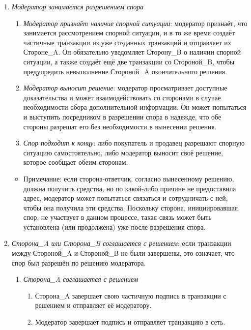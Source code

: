 \begin{enumerate}
\begin{enumerate}
        \item {\em Модератор занимается разрешением спора}
        \begin{enumerate}
            \item {\em Модератор признаёт наличие спорной ситуации}: модератор признаёт, что занимается рассмотрением спорной ситуации, и в то же время создаёт частич\-ные транзакции из уже созданных транзакций и отправляет их Стороне\_A. Он обязательно уведомляет Сторону\_B о наличии спорной ситуации, а также создаёт ещё две транзакции со Стороной\_B, чтобы предупредить невыполнение Стороной\_A окончательного решения.
            \item {\em Модератор выносит решение}: модератор просматривает доступные доказатель\-ства и может взаимодействовать со сторонами в случае необходимости сбора дополнительной информации. Он может попытаться и выступить посредником в разрешении спора в надежде, что обе стороны разрешат его без необходимости в вынесении решения.
            \item {\em Спор подходит к концу}: либо покупатель и продавец разрешают спорную ситуацию самостоятельно, либо модератор выносит своё решение, которое сооб\-щает обеим сторонам.
        \end{enumerate}{}
        \begin{itemize}
            \item Примечание: если сторона-ответчик, согласно вынесенному решению, должна получить средства, но по какой-либо причине не предоставила адрес, модератор может попытаться связаться и сотрудничать с ней, чтобы она получила эти средства. Поскольку сторона, инициировавшая спор, не участвует в данном процессе, такая связь может быть установлена (или продолжена) уже после разрешения спора.
        \end{itemize}{}
        \item {\em Сторона\_A или Сторона\_B соглашается с решением}: если транзакции между Стороной\_A и Стороной\_B не были завершены, это означает, что спор был разре\-шён по решению модератора.
        \begin{enumerate}
            \item {\em Сторона\_A соглашается с решением}
            \begin{enumerate}
                \item Сторона\_A завершает свою частичную подпись в транзакции с решением и отправляет её модератору.
                \item Модератор завершает подпись и отправляет транзакцию в сеть.

\end{enumerate}
\end{enumerate}
\end{enumerate}
\end{enumerate}
